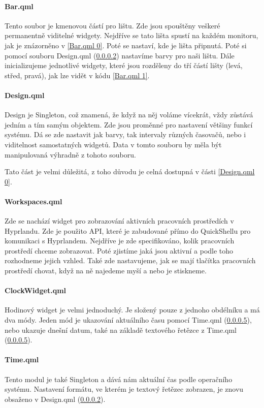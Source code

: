 \documentclass[12pt,a4paper]{article}
\begin{document}
\paragraph{Bar.qml}
\label{Bar.qml}
Tento soubor je kmenovou částí pro lištu. Zde jsou spouštěny veškeré permanentně viditelné widgety.
Nejdříve se tato lišta spustí na každém monitoru, jak je znázorněno v \ref{Bar.qml 0}. Poté se nastaví,
kde je lišta připnutá. Poté si pomocí souboru Design.qml (\ref{Design.qml}) nastavíme barvy pro naši lištu.
Dále inicializujeme jednotlivé widgety, které jsou rozděleny do tří částí lišty (levá, střed, pravá),
jak lze vidět v kódu \ref{Bar.qml 1}.

\paragraph{Design.qml}
\label{Design.qml}
Design je Singleton, což znamená, že když na něj voláme vícekrát, vždy zůstává jedním a tím samým objektem.
Zde jsou proměnné pro nastavení většiny funkcí systému. Dá se zde nastavit jak barvy, tak intervaly různých
časovačů, nebo i viditelnost samostatných widgetů. Data v tomto souboru by měla být manipulovaná výhradně z
tohoto souboru.

Tato část je velmi důležitá, z toho důvodu je celná dostupná v části \ref{Design.qml 0}.

\paragraph{Workspaces.qml}
\label{Workspaces.qml}
Zde se nachází widget pro zobrazování aktivních pracovních prostředích v Hyprlandu. Zde je použito API, které je 
zabudované přímo do QuickShellu pro komunikaci s Hyprlandem. Nejdříve je zde specifikováno, kolik pracovních prostředí
chceme zobrazovat. Poté zjistíme jaká jsou aktivní a podle toho rozhodneme jejich vzhled. Také zde nastavujeme, jak se
mají tlačítka pracovních prostředí chovat, když na ně najedeme myší a nebo je stiskneme.

\paragraph{ClockWidget.qml}
\label{ClockWidget.qml}
Hodinový widget je velmi jednoduchý. Je složený pouze z jednoho obdélníku a má dva módy. Jeden mód je ukazování aktuálního
času pomocí Time.qml (\ref{Time.qml}), nebo ukazuje dnešní datum, také na základě textového řetězce z Time.qml (\ref{Time.qml}).

\paragraph{Time.qml}
\label{Time.qml}
Tento modul je také Singleton a dává nám aktuální čas podle operačního systému. Nastavení formátu, ve kterém je textový
řetězec zobrazen, je znovu obsaženo v Design.qml (\ref{Design.qml}).
\end{document}
